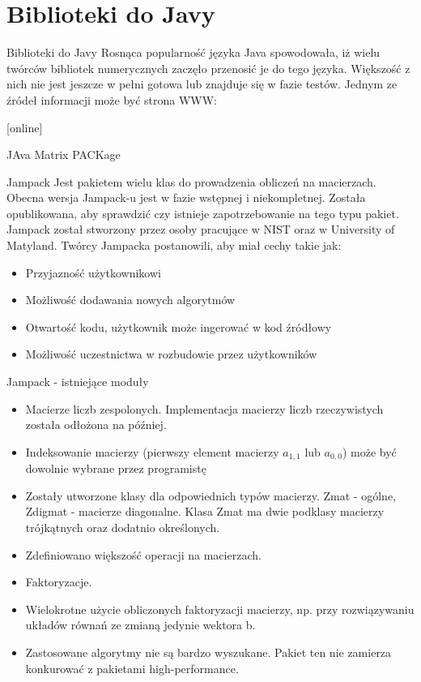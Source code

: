 \section{Biblioteki do Javy}
	\begin{frame}{Biblioteki do Javy}
		Rosnąca popularność języka Java spowodowała, iż wielu twórców bibliotek numerycznych zaczęło przenosić je do tego języka. Większość z nich nie jest jeszcze w pełni gotowa lub znajduje się w fazie testów. Jednym ze źródeł informacji może być strona WWW:
		\begin{thebibliography}{9}
		\end{thebibliography}
	\end{frame}
	\begin{frame}{JAva Matrix PACKage}
		\begin{block}{Jampack}
			Jest pakietem wielu klas do prowadzenia obliczeń na macierzach. Obecna wersja Jampack-u jest w fazie wstępnej i niekompletnej. Została opublikowana, aby sprawdzić czy istnieje zapotrzebowanie na tego typu pakiet. Jampack został stworzony przez osoby pracujące w NIST oraz w University of Matyland. Twórcy Jampacka postanowili, aby miał cechy takie jak:
			\begin{itemize}
				\item Przyjazność użytkownikowi
				\item Możliwość dodawania nowych algorytmów
				\item Otwartość kodu, użytkownik może ingerować w kod źródłowy
				\item Możliwość uczestnictwa w rozbudowie przez użytkowników\
			\end{itemize}
		\end{block}
	\end{frame}
	\begin{frame}{Jampack - istniejące moduły}
		\begin{itemize}
			\item Macierze liczb zespolonych. Implementacja macierzy liczb rzeczywistych została odłożona na później.
			\item Indeksowanie macierzy (pierwszy element macierzy $a_{1,1}$ lub $a_{0,0}$) może być dowolnie wybrane przez programistę
			\item Zostały utworzone klasy dla odpowiednich typów macierzy. Zmat - ogólne, Zdigmat - macierze diagonalne. Klasa Zmat ma dwie podklasy macierzy trójkątnych oraz dodatnio określonych. 
			\item Zdefiniowano większość operacji na macierzach. 
			\item Faktoryzacje.
			\item Wielokrotne użycie obliczonych faktoryzacji macierzy, np. przy rozwiązywaniu układów równań ze zmianą jedynie wektora b.
			\item Zastosowane algorytmy nie są bardzo wyszukane. Pakiet ten nie zamierza konkurować z pakietami high-performance.
		\end{itemize}
		
	\end{frame}
